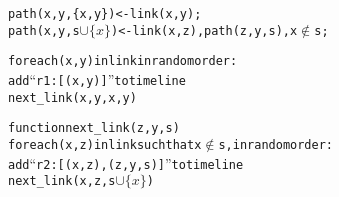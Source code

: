 

\begin{alltt}
path(x,y,\{x,y\}) <- link(x,y);
path(x,y,s \(\cup \{x\}\)) <- link(x,z), path(z,y,s), x \(\not\in\) s;
\end{alltt}


\begin{alltt}
for each (x,y) in link in random order:
   add ``r1: [(x,y)]'' to timeline
   next_link(x,y,{x,y})

function next_link(z,y,s)
   for each (x,z) in link such that x \(\not\in\) s, in random order:
      add ``r2: [(x,z), (z,y,s)]'' to timeline
      next_link(x,z,s\(\cup\{x\}\))
\end{alltt}
